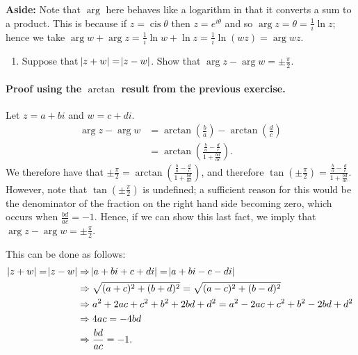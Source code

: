 \documentclass[a4paper,10pt]{article}
\DeclareMathOperator{\cis}{cis}
\DeclareMathOperator{\carg}{arg}
\newcommand{\answer}{\bfseries\color{Emerald}\refstepcounter{enumi}\item[\theenumi.]}
\begin{document}
\textbf{Aside: }
Note that $ \carg $ here behaves like a logarithm in that it converts a sum to a product. This
is because if $ z = \cis \theta $ then $ z = e^{i\theta} $ and so $ \carg z = \theta = \frac{1}{i} \ln z $;
hence we take $ \carg w + \carg z = \frac{1}{i}{\ln w + \ln z} = \frac{1}{i} \ln (wz) = \carg wz $.

\filbreak\begin{enumerate}[resume]
  \answer Suppose that $ \abs{z+w} = \abs{z-w} $. Show that $ \carg z - \carg w = \pm \frac{\pi}{2} $.
\end{enumerate}

\paragraph{Proof using the $ \arctan $ result from the previous exercise.}
Let $ z = a+bi $ and $ w = c+di $.
\begin{align*}
  \carg z - \carg w &= \arctan \left( \frac{b}{a} \right) - \arctan \left( \frac{d}{c} \right)\\
                    &= \arctan \left( \frac{\frac{b}{a} - \frac{d}{c}}{1+ \frac{bd}{ac}} \right).
\end{align*}
We therefore have that $ \pm \frac{\pi}{2} = \arctan \left( \frac{\frac{b}{a} - \frac{d}{c}}{1+ \frac{bd}{ac}} \right) $,
and therefore $ \tan \left( \pm \frac{\pi}{2} \right) = \frac{\frac{b}{a} - \frac{d}{c}}{1+ \frac{bd}{ac}} $. However, note that
$ \tan \left( \pm \frac{\pi}{2} \right) $ is undefined; a sufficient reason for this would be the denominator of the fraction on the
right hand side becoming zero, which occurs when $ \frac{bd}{ac} = -1 $. Hence, if we can show this last fact, we
imply that $ \carg z - \carg w = \pm \frac{\pi}{2} $.

This can be done as follows:
\begin{align*}
  \abs{z + w} = \abs{z - w} &\Rightarrow \abs{a + bi + c + di} = \abs{a + bi - c - di}\\
                            &\Rightarrow \sqrt{(a+c)^2 + (b+d)^2} = \sqrt{(a-c)^2 + (b-d)^2}\\
                            &\Rightarrow a^2 + 2ac + c^2 + b^2 + 2bd + d^2 = a^2 - 2ac + c^2 + b^2 - 2bd + d^2\\
                            &\Rightarrow 4ac = -4bd\\
                            &\Rightarrow \frac{bd}{ac} = -1.
\end{align*}
\end{document}

